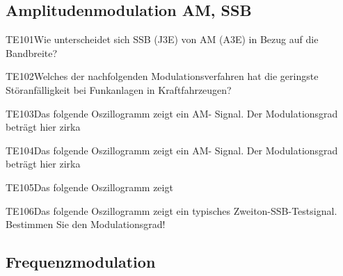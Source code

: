 \subsection{Amplitudenmodulation AM, SSB}

\begin{question}{TE101}{Wie unterscheidet sich SSB (J3E) von AM (A3E) in Bezug auf die Bandbreite?}
\end{question}

\begin{question}{TE102}{Welches der nachfolgenden Modulationsverfahren hat die geringste Störanfälligkeit bei Funkanlagen in Kraftfahrzeugen?}
\end{question}

\begin{question}{TE103}{Das folgende Oszillogramm zeigt ein AM- Signal. Der Modulationsgrad beträgt hier zirka}
\end{question}

\begin{question}{TE104}{Das folgende Oszillogramm zeigt ein AM- Signal. Der Modulationsgrad beträgt hier zirka}
\end{question}

\begin{question}{TE105}{Das folgende Oszillogramm zeigt}
\end{question}

\begin{question}{TE106}{Das folgende Oszillogramm zeigt ein typisches Zweiton-SSB-Testsignal. Bestimmen Sie den Modulationsgrad!}
\end{question}

\subsection{Frequenzmodulation}

